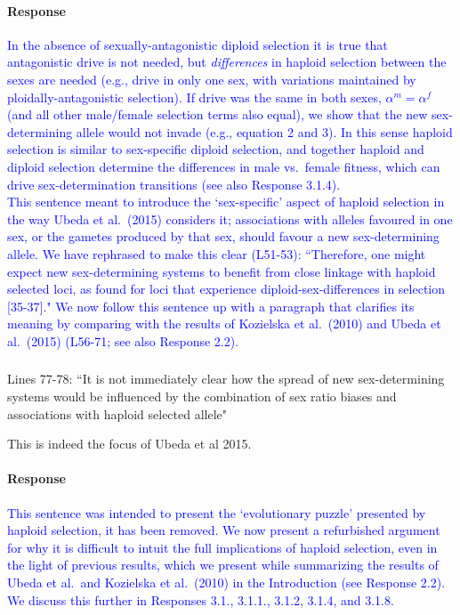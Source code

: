 \documentclass[10pt,letterpaper]{article}
\begin{document}
\noindent\paragraph{Response}
\textcolor{blue}{In the absence of sexually-antagonistic diploid selection it is true that antagonistic drive is not needed, but \textit{differences} in haploid selection between the sexes are needed (e.g., drive in only one sex, with variations maintained by ploidally-antagonistic selection). 
If drive was the same in both sexes, $\alpha^{m}=\alpha^{f}$ (and all other male/female selection terms also equal), we show that the new sex-determining allele would not invade (e.g., equation 2 and 3). 
In this sense haploid selection is similar to sex-specific diploid selection, and together haploid and diploid selection determine the differences in male vs.\ female fitness, which can drive sex-determination transitions (see also Response 3.1.4).
\\
\indent
This sentence meant to introduce the `sex-specific' aspect of haploid selection in the way Ubeda et al.\ (2015) considers it; associations with alleles favoured in one sex, or the gametes produced by that sex, should favour a new sex-determining allele.
We have rephrased to make this clear (L51-53): ``Therefore, one might expect new sex-determining systems to benefit from close linkage with haploid selected loci, as found for loci that experience diploid-sex-differences in selection [35-37]."
We now follow this sentence up with a paragraph that clarifies its meaning by comparing with the results of Kozielska et al.\ (2010) and Ubeda et al.\ (2015) (L56-71; see also Response 2.2).}

\noindent\subsubsection{}
Lines 77-78: ``It is not immediately clear how the spread of new sex-determining systems would be influenced by the combination of sex ratio biases and associations with haploid selected allele"

This is indeed the focus of Ubeda et al 2015.

\noindent\paragraph{Response}
\textcolor{blue}{
This sentence was intended to present the `evolutionary puzzle' presented by haploid selection, it has been removed. 
We now present a refurbished argument for why it is difficult to intuit the full implications of haploid selection, even in the light of previous results, which we present while summarizing the results of Ubeda et al.\ and Kozielska et al.\ (2010) in the Introduction (see Response 2.2).
We discuss this further in Responses 3.1., 3.1.1., 3.1.2, 3.1.4, and 3.1.8.
}
\end{document}
